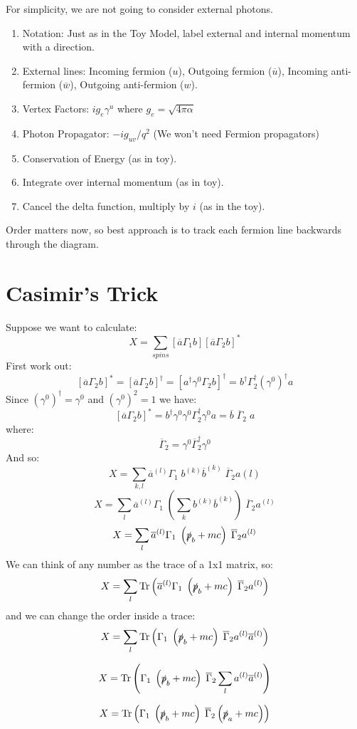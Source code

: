\documentclass[12pt]{book}
\begin{document}
For simplicity, we are not going to consider external photons.  
\begin{enumerate}
\item Notation:  Just as in the Toy Model, label external and internal momentum with a direction.
\item External lines: Incoming fermion ($u$), Outgoing fermion ($\overline{u}$), 
Incoming anti-fermion ($\overline{w}$), Outgoing anti-fermion ($w$).
\item Vertex Factors:  $i g_e \gamma^u$ where $g_e = \sqrt{4\pi \alpha}$
\item Photon Propagator:  $-ig_{uv}/q^2$  (We won't need Fermion propagators)
\item Conservation of Energy (as in toy).
\item Integrate over internal momentum (as in toy).
\item Cancel the delta function, multiply by $i$ (as in the toy).
\end{enumerate}
Order matters now, so best approach is to track each fermion line backwards through the diagram.


\section{Casimir's Trick}

Suppose we want to calculate:
$$X = \sum_{spins} [\overline{a} \Gamma_1 b][\overline{a} \Gamma_2 b]^* $$
First work out:
$$[\overline{a} \Gamma_2 b]^* = [\overline{a} \Gamma_2 b]^\dagger
= [a^\dagger \gamma^0 \Gamma_2 b]^\dagger = b^\dagger \Gamma_2^\dagger (\gamma^0)^\dagger a$$
Since $(\gamma^0)^\dagger = \gamma^0$ and $(\gamma^0)^2 = 1$ we have:
$$[\overline{a} \Gamma_2 b]^* = b^\dagger \gamma^0 \gamma^0 \Gamma_2^\dagger \gamma^0 a
= \overline{b} \; \overline{\Gamma}_2 \; a$$
where:
$$\overline{\Gamma}_2 = \gamma^0 \overline{\Gamma}_2^\dagger \gamma^0$$
And so:
$$X = \sum_{k,l} \overline{a}^{(l)} \Gamma_1 \; b^{(k)} \overline{b}^{(k)} \; \overline{\Gamma}_2 a(l)$$
$$ X = 
\sum_{l} \overline{a}^{(l)} \Gamma_1 \; \left(\sum_k b^{(k)} \overline{b}^{(k)} \right) \; \overline{\Gamma}_2 a^{(l)}$$
$$ X = 
\sum_{l} \overline{a}^{(l)} \Gamma_1 \; \left(\slashed{p}_b + mc \right) \; \overline{\Gamma}_2 a^{(l)}$$
We can think of any number as the trace of a 1x1 matrix, so:
$$ X = \sum_{l} {\rm Tr}\left(\overline{a}^{(l)} \Gamma_1 \; \left(\slashed{p}_b + mc \right) \; \overline{\Gamma}_2 a^{(l)}\right)$$
and we can change the order inside a trace:
$$ X = \sum_{l} {\rm Tr}\left(\Gamma_1 \; \left(\slashed{p}_b + mc \right) \; \overline{\Gamma}_2 a^{(l)} \overline{a}^{(l)} \right)$$

$$ X = {\rm Tr}\left(\Gamma_1 \; \left(\slashed{p}_b + mc \right) \; \overline{\Gamma}_2 \sum_{l} a^{(l)} \overline{a}^{(l)} \right)$$

$$ X = {\rm Tr}\left(\Gamma_1 \; \left(\slashed{p}_b + mc \right) \; \overline{\Gamma}_2  \left(\slashed{p}_a + mc \right) \right)$$
\end{document}
